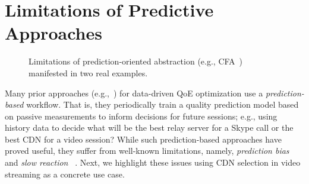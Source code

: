 \section{Limitations of Predictive Approaches}
\label{sec:pytheas:limitations}



\begin{figure}[t!]
\captionsetup[subfigure]{justification=centering,farskip=-1pt,captionskip=5pt}
\centering
\caption{Limitations of prediction-oriented abstraction (e.g., CFA~\cite{cfa}) manifested in two real examples.}
\label{fig:abstraction}
\end{figure}


Many prior approaches (e.g.,~\cite{c3,cfa,cs2p,footprint}) 
for data-driven QoE optimization use a {\em prediction-based} 
workflow.  
That is, they periodically train a quality prediction model 
based on  passive measurements to inform decisions for 
future sessions; e.g., using history data to decide what 
will be  the best relay server for a Skype call or the best 
CDN for a video session?   
While such prediction-based approaches have proved useful, 
they suffer from well-known limitations, namely, 
{\em prediction bias} and {\em slow reaction}
~\cite{he2009learning,spand}.  
Next, we  highlight these issues using  CDN selection in 
video streaming as a concrete use case.%

